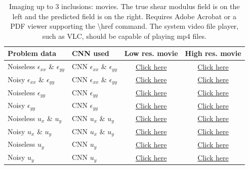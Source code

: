\documentclass[12pt]{article}
\begin{document}
\begin{table}
  \centering
  \begin{tabular}{|l|l|c|c|}
    \hline
    Problem data & CNN used & Low res. movie  & High res. movie\\
    \hline
    Noiseless $\epsilon_{xx}$ \& $\epsilon_{yy}$ & CNN $\epsilon_{xx}$ \& $\epsilon_{yy}$ &
    \href{run:movies/three/field\_strainxxyy\_noise\_0.0\_movie.mp4}{Click here} & 
    \href{run:movies\_hi\_res/three/field\_strainxxyy\_noise\_0.0\_movie\_hires.mp4}{Click here}\\
    \hline
    Noisy $\epsilon_{xx}$ \& $\epsilon_{yy}$ & CNN $\epsilon_{xx}$ \& $\epsilon_{yy}$ &
    \href{run:movies/three/field\_strainxxyy\_noise\_0.02\_movie.mp4}{Click here} &
    \href{run:movies\_hi\_res/three/field\_strainxxyy\_noise\_0.02\_movie\_hires.mp4}{Click here}\\ 
    \hline
    Noiseless $\epsilon_{yy}$ & CNN $\epsilon_{yy}$ &
    \href{run:movies/three/field\_strainyy\_noise\_0.0\_movie.mp4}{Click here} &
    \href{run:movies\_hi\_res/three/field\_strainyy\_noise\_0.0\_movie\_hires.mp4}{Click here}\\
    \hline
    Noisy $\epsilon_{yy}$ & CNN $\epsilon_{yy}$ &
    \href{run:movies/three/field\_strainyy\_noise\_0.02\_movie.mp4}{Click here} &
    \href{run:movies\_hi\_res/three/field\_strainyy\_noise\_0.02\_movie\_hires.mp4}{Click here}\\
    \hline
    Noiseless $u_x$ \& $u_y$ & CNN $u_x$ \& $u_y$ &
    \href{run:movies/three/field\_images\_noise\_0.0\_movie.mp4}{Click here} &
    \href{run:movies\_hi\_res/three/field\_images\_noise\_0.0\_movie\_hires.mp4}{Click here}\\
    \hline
    Noisy $u_x$ \& $u_y$ & CNN $u_x$ \& $u_y$ &
    \href{run:movies/three/field\_images\_noise\_0.02\_movie.mp4}{Click here} &
    \href{run:movies\_hi\_res/three/field\_images\_noise\_0.02\_movie\_hires.mp4}{Click here}\\
    \hline
    Noiseless $u_y$ & CNN $u_y$ &
    \href{run:movies/three/field\_imagesy\_noise\_0.0\_movie.mp4}{Click here} &
    \href{run:movies\_hi\_res/three/field\_imagesy\_noise\_0.0\_movie\_hires.mp4}{Click here}\\
    \hline
    Noisy $u_y$ & CNN $u_y$ &
    \href{run:movies/three/field\_imagesy\_noise\_0.02\_movie.mp4}{Click here} &
    \href{run:movies\_hi\_res/three/field\_imagesy\_noise\_0.02\_movie\_hires.mp4}{Click here}\\
    \hline
  \end{tabular}
  \caption{\label{fig:threeinc:movie} Imaging up to 3 inclusions: movies. The true shear modulus field is on the left and the predicted field is on the right. Requires Adobe Acrobat or a PDF viewer supporting the \textbackslash{href} command. The system video file player, such as VLC, should be capable of playing mp4 files.}
\end{table}
\end{document}
